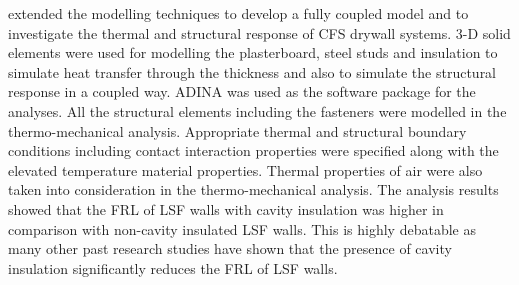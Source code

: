 \citet{Thanasoulas2018} extended the modelling techniques to develop a fully coupled model and to investigate the thermal and structural response of CFS drywall systems. 3-D solid elements were used for modelling the plasterboard, steel studs and insulation to simulate heat transfer through the thickness and also to simulate the structural response in a coupled way. ADINA was used as the software package for the analyses. All the structural elements including the fasteners were modelled in the thermo-mechanical analysis. Appropriate thermal and structural boundary conditions including contact interaction properties were specified along with the elevated temperature material properties. Thermal properties of air were also taken into consideration in the thermo-mechanical analysis. The analysis results showed that the FRL of LSF walls with cavity insulation was higher in comparison with non-cavity insulated LSF walls. This is highly debatable as many other past research studies have shown that the presence of cavity insulation significantly reduces the FRL of LSF walls. 

